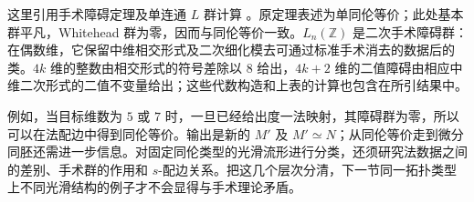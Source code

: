 这里引用手术障碍定理及单连通 \(L\) 群计算 \cite[定理3.2、13A.1]{Wall1999Surgery}。原定理表述为单同伦等价；此处基本群平凡，Whitehead 群为零，因而与同伦等价一致。\(L_n(\mathbb Z)\) 是二次手术障碍群：在偶数维，它保留中维相交形式及二次细化模去可通过标准手术消去的数据后的类。\(4k\) 维的整数由相交形式的符号差除以 \(8\) 给出，\(4k+2\) 维的二值障碍由相应中维二次形式的二值不变量给出；这些代数构造和上表的计算也包含在所引结果中。

\ProseParagraphBreak

例如，当目标维数为 \(5\) 或 \(7\) 时，一旦已经给出度一法映射，其障碍群为零，所以可以在法配边中得到同伦等价。输出是新的 \(M'\) 及 \(M'\simeq N\)；从同伦等价走到微分同胚还需进一步信息。对固定同伦类型的光滑流形进行分类，还须研究法数据之间的差别、手术群的作用和 \(s\)-配边关系。把这几个层次分清，下一节同一拓扑类型上不同光滑结构的例子才不会显得与手术理论矛盾。
